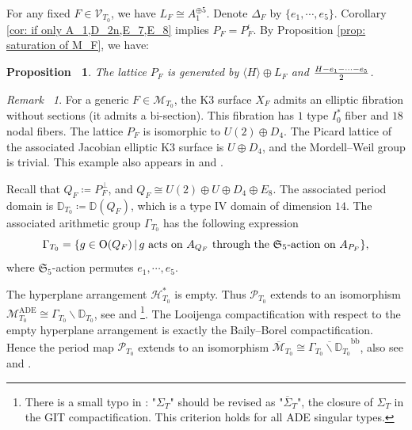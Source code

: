 \documentclass[12pt,reqno,a4paper]{amsart}
\newtheorem{prop}[thm]{Proposition~}
\theoremstyle{remark}
\newtheorem{rmk}[thm]{Remark~}
\theoremstyle{definition}
\begin{document}
For any fixed $F\in\mathcal{V}_{T_0}$, we have $L_F\cong A_1^{\oplus 5}$.
Denote $\Delta_F$ by $\{ e_1,\cdots,e_5 \}$.
Corollary \ref{cor: if only A_1,D_2n,E_7,E_8} implies $P_F=P_F^{\iota}$. By Proposition \ref{prop: saturation of M_F}, we have:
\begin{prop}
    The lattice $P_F$ is generated by $\langle H\rangle\oplus L_F$ and ${H-e_1-\cdots-e_5\over2}$.
\end{prop}
\begin{rmk}
    For a generic $F\in\mathcal{M}_{T_0}$, the K3 surface $X_F$ admits an elliptic fibration without sections (it admits a bi-section). This fibration has $1$ type $I_0^*$ fiber and $18$ nodal fibers. 
    The lattice $P_F$ is isomorphic to $U(2)\oplus D_4$. 
        The Picard lattice of the associated Jacobian elliptic K3 surface is $U\oplus D_4$, and the Mordell--Weil group is trivial. This example also appears in \cite[Table 1.1, No. 6]{belcastro2002picard} and \cite[Table 2]{clingher2024neron-severi}.
\end{rmk}
Recall that $Q_F\coloneqq P_F^\perp$, and $Q_F\cong U(2)\oplus U\oplus D_4\oplus E_8$.
The associated period domain is $\mathbb{D}_{T_0}\coloneqq\mathbb{D}(Q_F)$, which is a type IV domain of dimension $14$. 
The associated arithmetic group $\Gamma_{T_0}$ has the following expression
\begin{equation*}
    \Gamma_{T_0} = \{ g\in\mathrm{O}(Q_F) \,|\, g \textup{ acts on } A_{Q_F} \textup{ through the } \mathfrak{S}_5\textup{-action on } A_{P_F}  \},
\end{equation*}
where $\mathfrak{S}_5$-action permutes $e_1,\cdots,e_5$.


The hyperplane arrangement $\mathcal{H}_{T_0}^*$ is empty. Thus $\mathscr{P}_{T_0}$ extends to an isomorphism $\mathcal{M}_{T_0}^{\mathrm{ADE}}\cong \Gamma_{T_0}\backslash\mathbb{D}_{T_0}$, see \cite[Theorem 4.1]{laza2009deformations} and \cite[Proposition 3.7]{yu2023moduli}\footnote{There is a small typo in \cite[Proposition 3.7]{yu2023moduli}: "$\Sigma_T$" should be revised as "$\overline{\Sigma}_T$", the closure of $\Sigma_T$ in the GIT compactification. This criterion holds for all ADE singular types.}.
The Looijenga compactification with respect to the empty hyperplane arrangement is exactly the Baily--Borel compactification.
Hence the period map $\mathscr{P}_{T_0}$ extends to an isomorphism $\overline{\mathcal{M}}_{T_0}\cong \overline{\Gamma_{T_0}\backslash\mathbb{D}_{T_0}}^{\mathrm{bb}}$, also see \cite[Theorem 4.2]{laza2009deformations} and \cite[Proposition 4.3]{yu2023moduli}.
\end{document}
